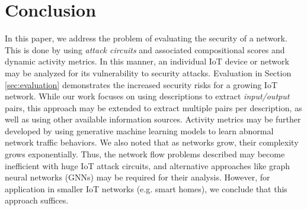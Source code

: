 \section{Conclusion}
\label{sec:conclusion}

In this paper, we address the problem of evaluating the security of a network. This is done by using \textit{attack circuits} and associated compositional scores and dynamic activity metrics. In this manner, an individual IoT device or network may be analyzed for its vulnerability to security attacks. Evaluation in Section \ref{sec:evaluation} demonstrates the increased security risks for a growing IoT network. While our work focuses on using descriptions to extract \textit{input/output} pairs, this approach may be extended to extract multiple pairs per description, as well as using other available information sources. Activity metrics may be further developed by using generative machine learning models to learn abnormal network traffic behaviors. We also noted that as networks grow, their complexity grows exponentially. Thus, the network flow problems described may become inefficient with huge IoT attack circuits, and alternative approaches like graph neural networks (GNNs) \cite{Scarselli09thegraph} may be required for their analysis. However, for application in smaller IoT networks (e.g. smart homes), we conclude that this approach suffices.



